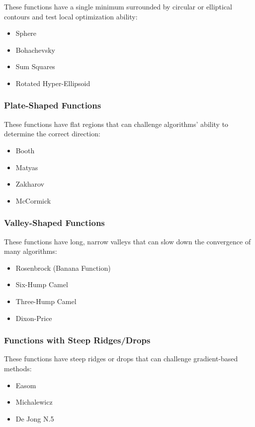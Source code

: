 These functions have a single minimum surrounded by circular or elliptical contours and test local optimization ability:

\begin{itemize}
    \item Sphere
    \item Bohachevsky
    \item Sum Squares
    \item Rotated Hyper-Ellipsoid
\end{itemize}

\subsubsection{Plate-Shaped Functions}

These functions have flat regions that can challenge algorithms' ability to determine the correct direction:

\begin{itemize}
    \item Booth
    \item Matyas
    \item Zakharov
    \item McCormick
\end{itemize}

\subsubsection{Valley-Shaped Functions}

These functions have long, narrow valleys that can slow down the convergence of many algorithms:

\begin{itemize}
    \item Rosenbrock (Banana Function)
    \item Six-Hump Camel
    \item Three-Hump Camel
    \item Dixon-Price
\end{itemize}

\subsubsection{Functions with Steep Ridges/Drops}

These functions have steep ridges or drops that can challenge gradient-based methods:

\begin{itemize}
    \item Easom
    \item Michalewicz
    \item De Jong N.5
\end{itemize}


